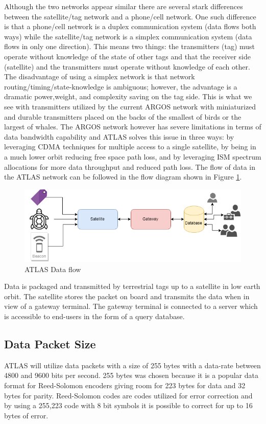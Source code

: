 \documentclass{article}
\begin{document}
Although the two networks appear similar there are several stark differences between the satellite/tag network and a phone/cell network. One such difference is that a phone/cell network is a duplex communication system (data flows both ways) while the satellite/tag network is a simplex communication system (data flows in only one direction). This means two things: the transmitters (tag) must operate without knowledge of the state of other tags and that the receiver side (satellite) and the transmitters must operate without knowledge of each other. The disadvantage of using a simplex network is that network routing/timing/state-knowledge is ambiguous; however, the advantage is a dramatic power,weight, and complexity saving on the tag side. This is what we see with transmitters utilized by the current ARGOS network with miniaturized and durable transmitters placed on the backs of the smallest of birds or the largest of whales. The ARGOS network however has severe limitations in terms of data bandwidth capability and ATLAS solves this issue in three ways: by leveraging CDMA techniques for multiple access to a single satellite, by being in a much lower orbit reducing free space path loss, and by leveraging ISM spectrum allocations for more data throughput and reduced path loss. The flow of data in the ATLAS network can be followed in the flow diagram shown in Figure \ref{fig:data_flow}.

\begin{figure}[H]
  \centering
  \includegraphics[width=\linewidth]{figures/data_flow}
  \caption{ATLAS Data flow}
  \label{fig:data_flow}
\end{figure}

Data is packaged and transmitted by terrestrial tags up to a satellite in low earth orbit. The satellite stores the packet on board and transmits the data when in view of a gateway terminal. The gateway terminal is connected to a server which is accessible to end-users in the form of a query database.

\subsection{Data Packet Size}
ATLAS will utilize data packets with a size of 255 bytes with a data-rate between 4800 and 9600 bits per second. 255 bytes was chosen because it is a popular data format for Reed-Solomon encoders giving room for 223 bytes for data and 32 bytes for parity. Reed-Solomon codes are codes utilized for error correction and by using a 255,223 code with 8 bit symbols it is possible to correct for up to 16 bytes of error. 
\end{document}
